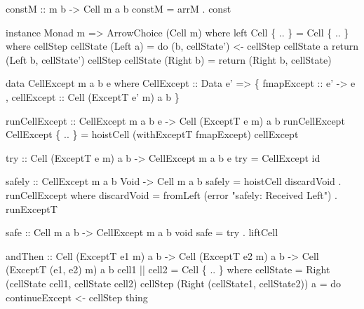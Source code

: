 constM :: m b -\textgreater{} Cell m a b constM = arrM . const

instance Monad m =\textgreater{} ArrowChoice (Cell m) where left Cell \{
.. \} = Cell \{ .. \} where cellStep cellState (Left a) = do (b,
cellState') \textless{}- cellStep cellState a return (Left b,
cellState') cellStep cellState (Right b) = return (Right b, cellState)

data CellExcept m a b e where CellExcept :: Data e' =\textgreater{} \{
fmapExcept :: e' -\textgreater{} e , cellExcept :: Cell (ExceptT e' m) a
b \}

runCellExcept :: CellExcept m a b e -\textgreater{} Cell (ExceptT e m) a
b runCellExcept CellExcept \{ .. \} = hoistCell (withExceptT fmapExcept)
cellExcept

try :: Cell (ExceptT e m) a b -\textgreater{} CellExcept m a b e try =
CellExcept id

safely :: CellExcept m a b Void -\textgreater{} Cell m a b safely =
hoistCell discardVoid . runCellExcept where discardVoid = fromLeft
(error "safely: Received Left") . runExceptT

safe :: Cell m a b -\textgreater{} CellExcept m a b void safe = try .
liftCell

andThen :: Cell (ExceptT e1 m) a b -\textgreater{} Cell (ExceptT e2 m) a
b -\textgreater{} Cell (ExceptT (e1, e2) m) a b cell1
\VERB|| cell2 = Cell \{ .. \} where cellState = Right
(cellState cell1, cellState cell2) cellStep (Right (cellState1,
cellState2)) a = do continueExcept \textless{}- cellStep thing

